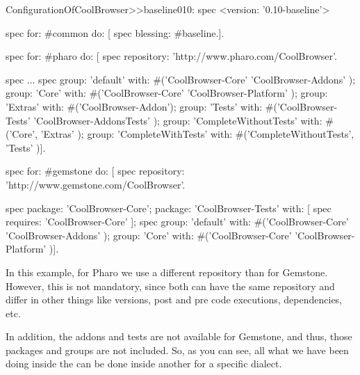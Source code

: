 \documentclass[a4paper,10pt,twoside]{book}
\begin{document}
  \begin{code}{}
 ConfigurationOfCoolBrowser>>baseline010: spec 
       <version: '0.10-baseline'>
       
       spec for: #common do: [
              spec blessing: #baseline.].
       
       spec for: #pharo do: [
              spec repository: 'http://www.pharo.com/CoolBrowser'.
              
              spec 
                     ...
              spec 
                     group: 'default' with: #('CoolBrowser-Core' 'CoolBrowser-Addons' );
                     group: 'Core' with: #('CoolBrowser-Core' 'CoolBrowser-Platform' );
                     group: 'Extras' with: #('CoolBrowser-Addon');
                     group: 'Tests' with: #('CoolBrowser-Tests' 'CoolBrowser-AddonsTests' );
                     group: 'CompleteWithoutTests' with: #('Core', 'Extras' );
                     group: 'CompleteWithTests' with: #('CompleteWithoutTests', 'Tests' )].
                     
       spec for: #gemstone do: [
              spec repository: 'http://www.gemstone.com/CoolBrowser'.
              
              spec 
                     package: 'CoolBrowser-Core';
                     package: 'CoolBrowser-Tests' with: [ spec requires: 'CoolBrowser-Core' ];
              spec 
                     group: 'default' with: #('CoolBrowser-Core' 'CoolBrowser-Addons' );
                     group: 'Core' with: #('CoolBrowser-Core' 'CoolBrowser-Platform' )].                     

\end{code}       
       
In this example, for Pharo we use a different repository than for Gemstone. However, this is not mandatory, since both can have the same repository and differ in other things like versions, post and pre code executions, dependencies, etc. 

In addition, the addons and tests are not available for Gemstone, and thus, those packages and groups are not included. So, as you can see, all what we have been doing inside the  can be done inside another  for a specific dialect. 


%
%
\end{document}
